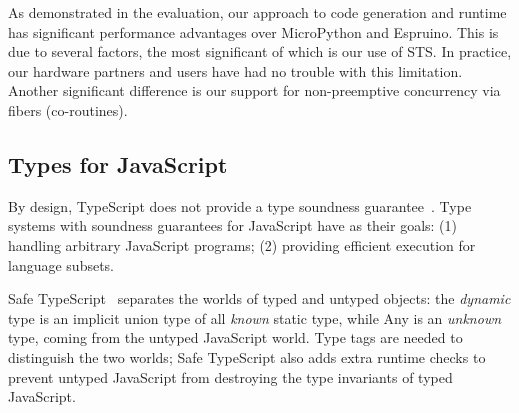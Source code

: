 As demonstrated in the evaluation, our approach to code generation and runtime
has significant performance advantages over MicroPython and Espruino.
This is due to several factors, the most significant of which is our use of
STS. In practice, our hardware partners and users have had no
trouble with this limitation.  Another significant difference is our support
for non-preemptive concurrency via fibers (co-routines). 











\subsection{Types for JavaScript}

By design, TypeScript does not provide a type soundness guarantee~\cite{BiermanAT14}.
Type systems with soundness guarantees for JavaScript have as their
goals: (1) handling arbitrary JavaScript programs; 
(2) providing efficient execution for language subsets.

Safe TypeScript~\cite{SafeTypeScript15} separates the worlds of typed and untyped 
objects: the \emph{dynamic} type is an implicit union type of all \emph{known} static type, 
while Any is an \emph{unknown} type, coming from the untyped JavaScript world. Type tags 
are needed to distinguish the two worlds; Safe TypeScript also adds extra runtime checks
to prevent untyped JavaScript from destroying the type invariants of typed JavaScript.  

